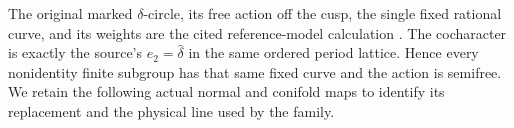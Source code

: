 \item The original marked $\delta$-circle, its free action off the cusp,
the single fixed rational curve, and its weights are the cited
reference-model calculation
\cite[Proposition~9.24 and Remarks~9.25--9.26, pp.~82--83]{AC26}.
The cocharacter is exactly the source's $e_2=\widehat\delta$ in the
same ordered period lattice. Hence every nonidentity finite subgroup
has that same fixed curve and the action is semifree. We retain the
following actual normal and conifold maps to identify its replacement
and the physical line used by the family.

